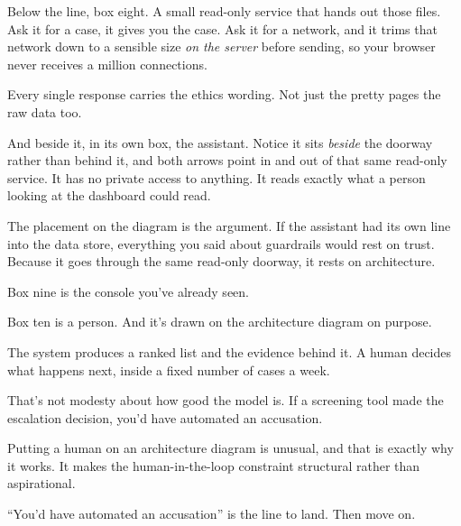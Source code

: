\documentclass[11pt]{article}
\begin{document}


\begin{saythis}
Below the line, box eight. A small read-only service that hands out those
files. Ask it for a case, it gives you the case. Ask it for a network, and it
trims that network down to a sensible size \emph{on the server} before sending,
so your browser never receives a million connections.

Every single response carries the ethics wording. Not just the pretty pages
\bt the raw data too.

And beside it, in its own box, the assistant. Notice it sits \emph{beside} the
doorway rather than behind it, and both arrows point in and out of that same
read-only service. It has no private access to anything. It reads exactly what
a person looking at the dashboard could read.
\end{saythis}

\begin{means}
The placement on the diagram is the argument. If the assistant had its own line
into the data store, everything you said about guardrails would rest on trust.
Because it goes through the same read-only doorway, it rests on architecture.
\end{means}


\begin{saythis}
Box nine is the console you've already seen.

Box ten is a person. And it's drawn on the architecture diagram on purpose.

The system produces a ranked list and the evidence behind it. A human decides
what happens next, inside a fixed number of cases a week.

That's not modesty about how good the model is. If a screening tool made the
escalation decision, you'd have automated an accusation.
\end{saythis}

\begin{means}
Putting a human on an architecture diagram is unusual, and that is exactly why
it works. It makes the human-in-the-loop constraint structural rather than
aspirational.

``You'd have automated an accusation'' is the line to land. Then move on.
\end{means}
\end{document}
